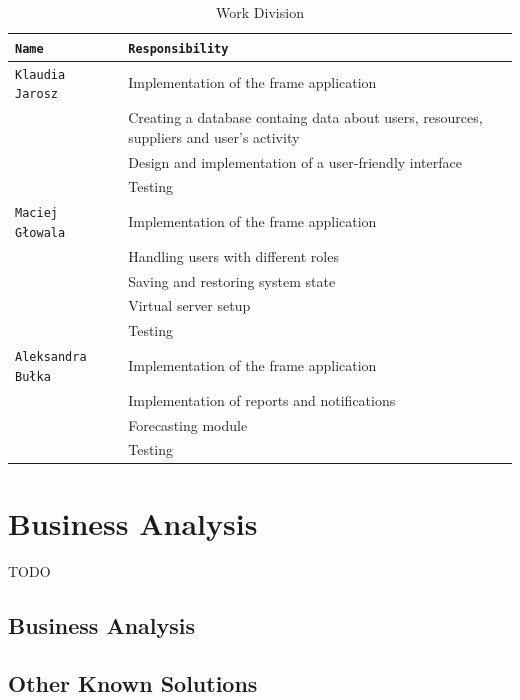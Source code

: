\documentclass[a4paper,11pt,twoside]{report}
\theoremstyle{definition}
\begin{document}
\begin{table}[!h]%
\caption[Work Division]{Work Division}
\label{division}
\centering
\begin{tabular}{|p{4cm}|p{12cm}|}
\hline
\texttt{Name} & \texttt{Responsibility} \\ \hline
\texttt{Klaudia Jarosz} & Implementation of the frame application\\ \cline{2-2}
\texttt{} & Creating a database containg data about users, resources, suppliers and user's activity\\  \cline{2-2}
\texttt{} & Design and implementation of a user-friendly interface \\ \cline{2-2}
\texttt{} & Testing \\ \hline
\texttt{Maciej Głowala} & Implementation of the frame application\\ \cline{2-2}
\texttt{} & Handling users with different roles\\  \cline{2-2}
\texttt{} & Saving and restoring system state \\ \cline{2-2}
\texttt{} & Virtual server setup \\ \cline{2-2}
\texttt{} & Testing \\ \hline
\texttt{Aleksandra Bułka} & Implementation of the frame application\\ \cline{2-2}
\texttt{} & Implementation of reports and notifications\\  \cline{2-2}
\texttt{} & Forecasting module\\ \cline{2-2}
\texttt{} & Testing \\ \hline


\end{tabular}
\end{table}




\chapter{Business Analysis}

TODO


\section{Business Analysis}

\section{Other Known Solutions}
\end{document}
